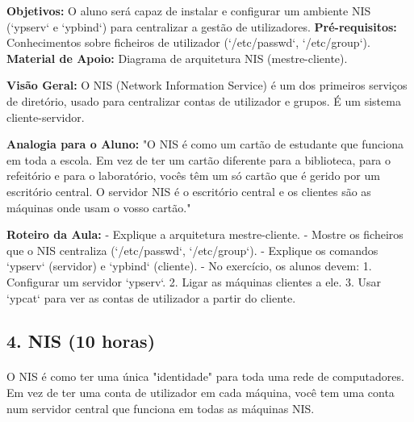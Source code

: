 \documentclass[10pt,a4paper]{article}
\newcommand{\guia}[1]{%
	\begin{tcolorbox}[
		colback=lightgray,
		colframe=darkblue,
		boxrule=1pt,
		arc=4mm,
		title=\textbf{Guia do Formador},
		fonttitle=\bfseries,
		coltitle=darkblue,
		boxsep=5pt,
		left=5mm, right=5mm, top=3mm, bottom=3mm
		]
		#1
	\end{tcolorbox}
}
\begin{document}
	\guia{
		\textbf{Objetivos:} O aluno será capaz de instalar e configurar um ambiente NIS (`ypserv` e `ypbind`) para centralizar a gestão de utilizadores.
		\textbf{Pré-requisitos:} Conhecimentos sobre ficheiros de utilizador (`/etc/passwd`, `/etc/group`).
		\textbf{Material de Apoio:} Diagrama de arquitetura NIS (mestre-cliente).
		
		\textbf{Visão Geral:} O NIS (Network Information Service) é um dos primeiros serviços de diretório, usado para centralizar contas de utilizador e grupos. É um sistema cliente-servidor.
		
		\textbf{Analogia para o Aluno:} "O NIS é como um cartão de estudante que funciona em toda a escola. Em vez de ter um cartão diferente para a biblioteca, para o refeitório e para o laboratório, vocês têm um só cartão que é gerido por um escritório central. O servidor NIS é o escritório central e os clientes são as máquinas onde usam o vosso cartão."
		
		\textbf{Roteiro da Aula:}
		- Explique a arquitetura mestre-cliente.
		- Mostre os ficheiros que o NIS centraliza (`/etc/passwd`, `/etc/group`).
		- Explique os comandos `ypserv` (servidor) e `ypbind` (cliente).
		- No exercício, os alunos devem: 1. Configurar um servidor `ypserv`. 2. Ligar as máquinas clientes a ele. 3. Usar `ypcat` para ver as contas de utilizador a partir do cliente.
	}
	\subsection*{4. NIS (10 horas)}
	\vspace{-1em}
	\paragraph{}
	O NIS é como ter uma única "identidade" para toda uma rede de computadores. Em vez de ter uma conta de utilizador em cada máquina, você tem uma conta num servidor central que funciona em todas as máquinas NIS.
	
\end{document}

